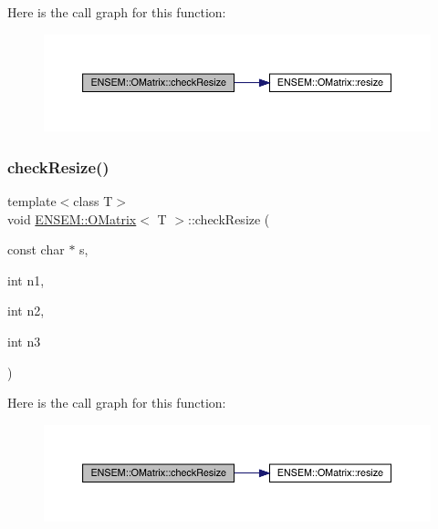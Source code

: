 Here is the call graph for this function\+:
\nopagebreak
\begin{figure}[H]
\begin{center}
\leavevmode
\includegraphics[width=350pt]{dd/d80/classENSEM_1_1OMatrix_a532d2138ecffc7a153b831401ca8b4df_cgraph}
\end{center}
\end{figure}
\mbox{\label{classENSEM_1_1OMatrix_a532d2138ecffc7a153b831401ca8b4df}} 
\subsubsection{\texorpdfstring{checkResize()}{checkResize()}\hspace{0.1cm}{\footnotesize\ttfamily [9/9]}}
{\footnotesize\ttfamily template$<$class T$>$ \\
void \mbox{\hyperlink{classENSEM_1_1OMatrix}{E\+N\+S\+E\+M\+::\+O\+Matrix}}$<$ T $>$\+::check\+Resize (\begin{DoxyParamCaption}\item[{const char $\ast$}]{s,  }\item[{int}]{n1,  }\item[{int}]{n2,  }\item[{int}]{n3 }\end{DoxyParamCaption})\hspace{0.3cm}{\ttfamily [inline]}}

Here is the call graph for this function\+:
\nopagebreak
\begin{figure}[H]
\begin{center}
\leavevmode
\includegraphics[width=350pt]{dd/d80/classENSEM_1_1OMatrix_a532d2138ecffc7a153b831401ca8b4df_cgraph}
\end{center}
\end{figure}
\mbox{\label{classENSEM_1_1OMatrix_abec80929ab7e8e2a23822fbbc841bd87}} 
